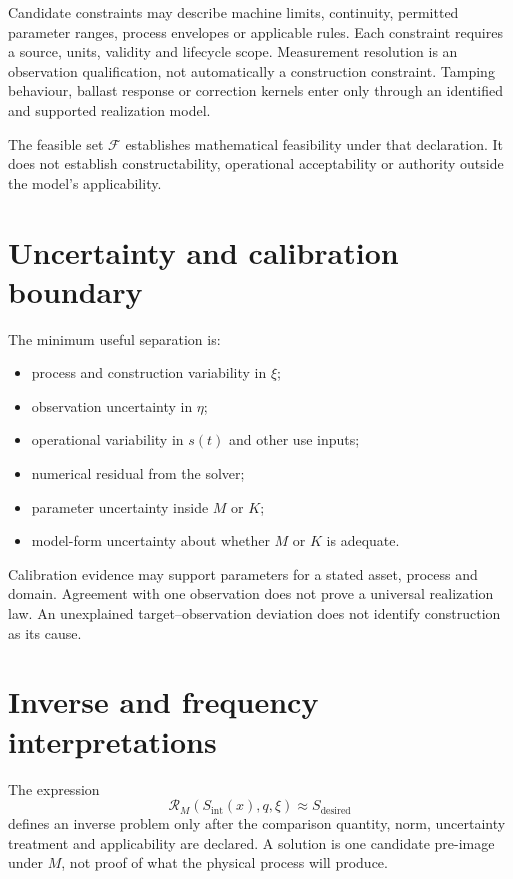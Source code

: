 Candidate constraints may describe machine limits, continuity, permitted
parameter ranges, process envelopes or applicable rules. Each constraint
requires a source, units, validity and lifecycle scope. Measurement resolution
is an observation qualification, not automatically a construction constraint.
Tamping behaviour, ballast response or correction kernels enter only through
an identified and supported realization model.

The feasible set \(\mathcal F\) establishes mathematical feasibility under
that declaration. It does not establish constructability, operational
acceptability or authority outside the model's applicability.

\section{Uncertainty and calibration boundary}

The minimum useful separation is:
\begin{itemize}
\item process and construction variability in \(\xi\);
\item observation uncertainty in \(\eta\);
\item operational variability in \(s(t)\) and other use inputs;
\item numerical residual from the solver;
\item parameter uncertainty inside \(M\) or \(K\);
\item model-form uncertainty about whether \(M\) or \(K\) is adequate.
\end{itemize}

Calibration evidence may support parameters for a stated asset, process and
domain. Agreement with one observation does not prove a universal
realization law. An unexplained target--observation deviation does not identify
construction as its cause.

\section{Inverse and frequency interpretations}

The expression
\[
\mathcal R_M(S_{\mathrm{int}}(x),q,\xi)
\approx S_{\mathrm{desired}}
\]
defines an inverse problem only after the comparison quantity, norm,
uncertainty treatment and applicability are declared. A solution is one
candidate pre-image under \(M\), not proof of what the physical process will
produce.

